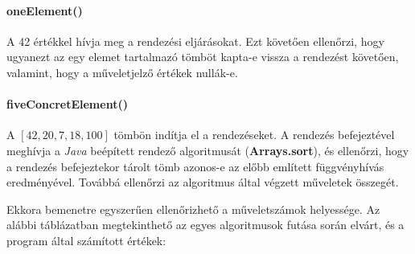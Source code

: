\documentclass{elteikthesis}
\begin{document}
\paragraph{oneElement()}
A 42 értékkel hívja meg a rendezési eljárásokat. Ezt követően ellenőrzi, hogy ugyanezt az egy elemet tartalmazó tömböt kapta-e vissza a rendezést követően, valamint, hogy a műveletjelző értékek nullák-e.
\paragraph{fiveConcretElement()}
A  $[42, 20, 7, 18, 100]$ tömbön indítja el a rendezéseket. A rendezés befejeztével meghívja a \emph{Java} beépített rendező algoritmusát (\textbf{Arrays.sort}), és ellenőrzi, hogy a rendezés befejeztekor tárolt tömb azonos-e az előbb említett függvényhívás eredményével. Továbbá ellenőrzi az algoritmus által végzett műveletek összegét.\par
Ekkora bemenetre egyszerűen ellenőrizhető a műveletszámok helyessége. Az alábbi táblázatban megtekinthető az egyes algoritmusok futása során elvárt, és a program által számított értékek:
\end{document}
